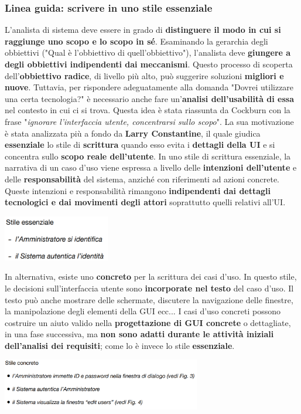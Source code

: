 \documentclass[12pt]{article}
\begin{document}
\subsubsection{Linea guida: scrivere in uno stile essenziale}
L'analista di sistema deve essere in grado di \textbf{distinguere il modo in cui si raggiunge uno scopo e lo scopo in sé}. Esaminando la gerarchia degli obbiettivi ("Qual è l'obbiettivo di quell'obbiettivo"), l'analista deve \textbf{giungere a degli obbiettivi indipendenti dai meccanismi}.
Questo processo di scoperta dell'\textbf{obbiettivo radice}, di livello più alto, può suggerire soluzioni \textbf{migliori e nuove}.
Tuttavia, per rispondere adeguatamente alla domanda "Dovrei utilizzare una certa tecnologia?" è necessario anche fare un'\textbf{analisi dell'usabilità di essa} nel contesto in cui ci si trova.
Questa idea è stata riassunta da Cockburn con la frase "\textit{ignorare l'interfaccia utente, concentrarsi sullo scopo}". La sua motivazione è stata analizzata più a fondo da \textbf{Larry Constantine}, il quale giudica \textbf{essenziale} lo stile di \textbf{scrittura} quando esso evita i \textbf{dettagli della UI} e si concentra sullo \textbf{scopo reale dell'utente}.
In uno stile di scrittura essenziale, la narrativa di un caso d'uso viene espressa a livello delle \textbf{intenzioni dell'utente} e delle \textbf{responsabilità} del sistema, anziché con riferimenti ad azioni concrete.
Queste intenzioni e responsabilità rimangono \textbf{indipendenti dai dettagli tecnologici e dai movimenti degli attori} soprattutto quelli relativi all'UI.
\begin{center}
    \includegraphics[width = 0.35\textwidth]{Images/33.png}
\end{center}
In alternativa, esiste uno \textbf{concreto} per la scrittura dei casi d'uso. In questo stile, le decisioni sull'interfaccia utente sono \textbf{incorporate nel testo} del caso d'uso.
Il testo può anche mostrare delle schermate, discutere la navigazione delle finestre, la manipolazione degli elementi della GUI ecc... 
I casi d'uso concreti possono costruire un aiuto valido nella \textbf{progettazione di GUI concrete} o dettagliate, in una fase successiva, ma \textbf{non sono adatti durante le attività iniziali dell'analisi dei requisiti}; come lo è invece lo stile \textbf{essenziale}.
\begin{center}
    \includegraphics[width = 0.65\textwidth]{Images/34.png}
\end{center}
\end{document}
